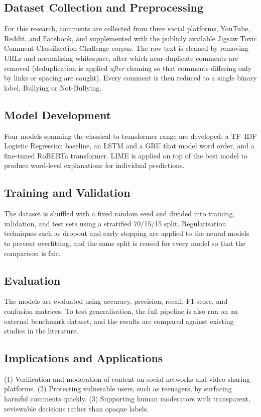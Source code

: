 \documentclass[12pt,a4paper]{article}
\begin{document}
\subsection{Dataset Collection and Preprocessing}
For this research, comments are collected from three social platforms, YouTube, Reddit, and Facebook, and supplemented with the publicly available Jigsaw Toxic Comment Classification Challenge corpus. The raw text is cleaned by removing URLs and normalising whitespace, after which near-duplicate comments are removed (deduplication is applied \emph{after} cleaning so that comments differing only by links or spacing are caught). Every comment is then reduced to a single binary label, Bullying or Not-Bullying.

\subsection{Model Development}
Four models spanning the classical-to-transformer range are developed: a TF--IDF Logistic Regression baseline, an LSTM and a GRU that model word order, and a fine-tuned RoBERTa transformer. LIME is applied on top of the best model to produce word-level explanations for individual predictions.

\subsection{Training and Validation}
The dataset is shuffled with a fixed random seed and divided into training, validation, and test sets using a stratified 70/15/15 split. Regularisation techniques such as dropout and early stopping are applied to the neural models to prevent overfitting, and the same split is reused for every model so that the comparison is fair.

\subsection{Evaluation}
The models are evaluated using accuracy, precision, recall, F1-score, and confusion matrices. To test generalisation, the full pipeline is also run on an external benchmark dataset, and the results are compared against existing studies in the literature.

\subsection{Implications and Applications}
(1) Verification and moderation of content on social networks and video-sharing platforms. (2) Protecting vulnerable users, such as teenagers, by surfacing harmful comments quickly. (3) Supporting human moderators with transparent, reviewable decisions rather than opaque labels.
\end{document}

